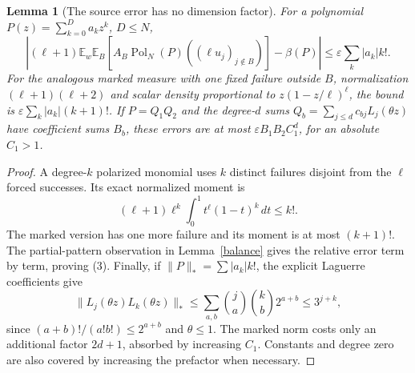 \documentclass[11pt]{article}
\newtheorem{lemma}{Lemma}
\newcommand{\E}{\mathbb E}
\newcommand{\Pol}{\operatorname{Pol}}
\begin{document}
\begin{lemma}[The source error has no dimension factor]\label{source}
For a polynomial $P(z)=\sum_{k=0}^D a_kz^k$, $D\le N$,
\[
 \left|(\ell+1)\E_w\E_B[A_B\Pol_N(P)((\ell u_j)_{j\notin B})]
                         -\beta(P)\right|
 \le\varepsilon\sum_k|a_k|k!.                  \tag{3}
\]
For the analogous marked measure with one fixed failure outside $B$,
normalization $(\ell+1)(\ell+2)$ and scalar density proportional to
$z(1-z/\ell)^\ell$, the bound is
$\varepsilon\sum_k|a_k|(k+1)!$.
If $P=Q_1Q_2$ and the degree-$d$ sums
$Q_b=\sum_{j\le d}c_{bj}L_j(\theta z)$ have coefficient sums $B_b$,
these errors are at most $\varepsilon B_1B_2 C_1^d$, for an absolute
$C_1>1$.
\end{lemma}
\begin{proof}
A degree-$k$ polarized monomial uses $k$ distinct failures disjoint
from the $\ell$ forced successes. Its exact normalized moment is
\[
 (\ell+1)\ell^k\int_0^1t^\ell(1-t)^k\,dt\le k!.
\]
The marked version has one more failure and its moment is at most
$(k+1)!$. The partial-pattern observation in Lemma~\ref{balance}
gives the relative error term by term, proving (3).
Finally, if $\|P\|_*=\sum|a_k|k!$, the explicit Laguerre coefficients
give
\[
 \|L_j(\theta z)L_k(\theta z)\|_*
 \le\sum_{a,b}\binom ja\binom kb2^{a+b}\le3^{j+k},
\]
since $(a+b)!/(a!b!)\le2^{a+b}$ and $\theta\le1$.
The marked norm costs only an additional factor $2d+1$, absorbed
by increasing $C_1$. Constants and degree zero are also covered by
increasing the prefactor when necessary.
\end{proof}
\end{document}
